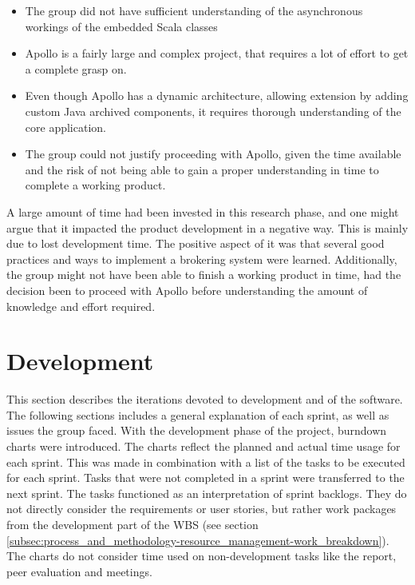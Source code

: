 \begin{itemize}
\item The group did not have sufficient understanding of the asynchronous workings of the embedded Scala classes
\item Apollo is a fairly large and complex project, that requires a lot of effort to get a complete grasp on.
\item Even though Apollo has a dynamic architecture, allowing extension by adding custom Java archived components, it requires thorough understanding of the core application.
\item The group could not justify proceeding with Apollo, given the time available and the risk of not being able to gain a proper understanding in time to complete a working product.
\end{itemize}

A large amount of time had been invested in this research phase, and one might argue that it impacted the product development in a negative way. This is mainly due to lost development time. The positive aspect of it was that several good practices and ways to implement a brokering system were learned. Additionally, the group might not have been able to finish a working product in time, had the decision been to proceed with Apollo before understanding the amount of knowledge and effort required.

\section{Development}
\label{subsec:project_lifecycle-development}

This section describes the iterations devoted to development and of the software. The following sections includes a general explanation of each sprint, as well as issues the group faced. With the development phase of the project, burndown charts were introduced. The charts reflect the planned and actual time usage for each sprint. This was made in combination with a list of the tasks to be executed for each sprint. Tasks that were not completed in a sprint were transferred to the next sprint. The tasks functioned as an interpretation of sprint backlogs. They do not directly consider the requirements or user stories, but rather work packages from the development part of the WBS (see section \ref{subsec:process_and_methodology-resource_management-work_breakdown}).  The charts do not consider time used on non-development tasks like the report, peer evaluation and meetings.

